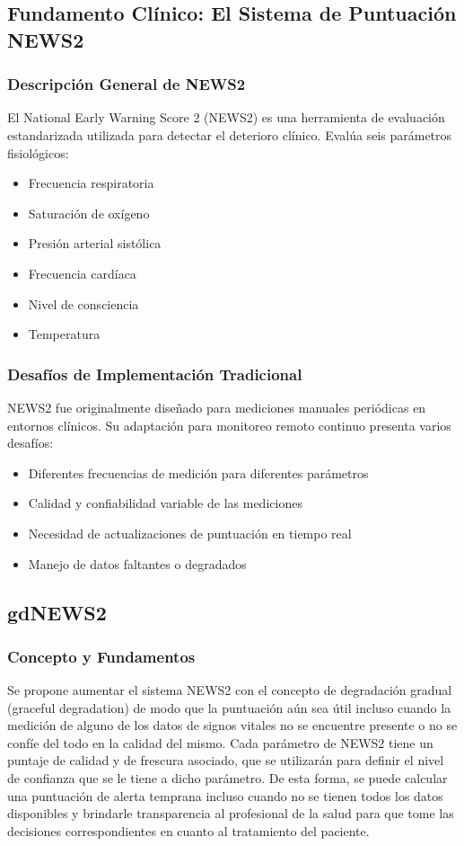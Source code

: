 \subsection{Fundamento Clínico: El Sistema de Puntuación NEWS2}

\subsubsection{Descripción General de NEWS2}
El National Early Warning Score 2 (NEWS2) es una herramienta de evaluación estandarizada utilizada para detectar el deterioro clínico. Evalúa seis parámetros fisiológicos:
\begin{itemize}
    \item Frecuencia respiratoria
    \item Saturación de oxígeno
    \item Presión arterial sistólica
    \item Frecuencia cardíaca
    \item Nivel de consciencia
    \item Temperatura
\end{itemize}

\subsubsection{Desafíos de Implementación Tradicional}
NEWS2 fue originalmente diseñado para mediciones manuales periódicas en entornos clínicos. Su adaptación para monitoreo remoto continuo presenta varios desafíos:
\begin{itemize}
    \item Diferentes frecuencias de medición para diferentes parámetros
    \item Calidad y confiabilidad variable de las mediciones
    \item Necesidad de actualizaciones de puntuación en tiempo real
    \item Manejo de datos faltantes o degradados
\end{itemize}

\subsection{gdNEWS2}

\subsubsection{Concepto y Fundamentos}
Se propone aumentar el sistema NEWS2 con el concepto de degradación gradual (graceful degradation) de modo que la puntuación aún sea útil incluso cuando la medición de alguno de los datos de signos vitales no 
se encuentre presente o no se confíe del todo en la calidad del mismo.
Cada parámetro de NEWS2 tiene un puntaje de calidad y de frescura asociado, que se utilizarán para definir el nivel de confianza que se le tiene a dicho parámetro.
De esta forma, se puede calcular una puntuación de alerta temprana incluso cuando no se tienen todos los datos disponibles 
y brindarle transparencia al profesional de la salud para que tome las decisiones correspondientes en cuanto al tratamiento del paciente.

